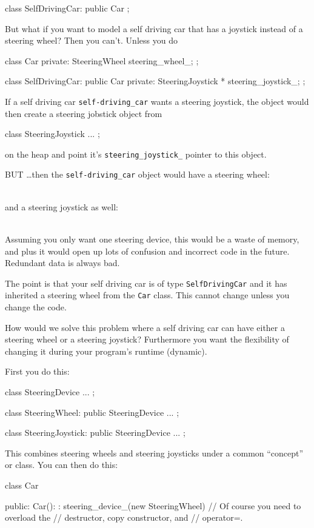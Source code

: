 \begin{console}
\begin{console}
class SelfDrivingCar: public Car
{
};
\end{console}
But what if you want to model a self driving car that has a joystick
instead of a steering wheel? Then you can't. Unless you do
\begin{console}
class Car
{
private:
     SteeringWheel steering_wheel_;
};

class SelfDrivingCar: public Car
{
private:
     SteeringJoystick * steering_joystick_;
};
\end{console}
If a self driving car \verb!self-driving_car! wants a steering joystick, the object would then create a steering jobstick object from
\begin{console}
class SteeringJoystick
{ ... };
\end{console}
on the heap and point it's \verb!steering_joystick_! pointer to this object.

BUT \ldots then the \verb!self-driving_car! object would have a steering wheel:

\\

and a steering joystick as well:

\\

Assuming you only want one steering device, this would be a waste of memory, and plus it would open up lots of confusion and incorrect code in the future. Redundant data is always bad.

The point is that your self driving car is of type \texttt{SelfDrivingCar} and it has inherited a steering wheel from the \texttt{Car} class. This cannot change unless you change the code.

How would we solve this problem where a self driving car can have either a steering wheel or a steering joystick? Furthermore you want the flexibility of changing it during your program's runtime (dynamic).

First you do this:
\begin{console}
class SteeringDevice
{ ... };

class SteeringWheel: public SteeringDevice
{ ... };

class SteeringJoystick: public SteeringDevice
{ ... };
\end{console}
This combines steering wheels and steering joysticks under a common ``concept'' or class. You can then do this:
\begin{console}
class Car
{
public:
     Car():
        : steering_device_(new SteeringWheel)
     {}
     // Of course you need to overload the
     // destructor, copy constructor, and
     // operator=.

}
\end{console}
\end{console}
